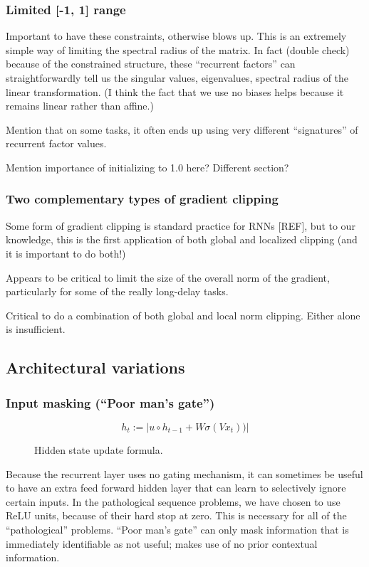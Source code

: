 \documentclass{article}
\begin{document}
\subsubsection{Limited [-1, 1] range}
Important to have these constraints, otherwise blows up.
This is an extremely simple way of limiting the spectral radius of the matrix.
In fact (double check) because of the constrained structure, these “recurrent factors” can straightforwardly tell us the singular values, eigenvalues, spectral radius of the linear transformation. (I think the fact that we use no biases helps because it remains linear rather than affine.)

Mention that on some tasks, it often ends up using very different “signatures” of recurrent factor values.

Mention importance of initializing to 1.0 here? Different section?
\subsubsection{Two complementary types of gradient clipping}

Some form of gradient clipping is standard practice for RNNs [REF], but to our knowledge, this is the first application of both global and localized clipping (and it is important to do both!)

Appears to be critical to limit the size of the overall norm of the gradient, particularly for some of the really long-delay tasks.

Critical to do a combination of both global and local norm clipping. Either alone is insufficient.
\subsection{Architectural variations}
\subsubsection{Input masking (“Poor man’s gate”)}

\begin{figure}
  \centering
  \[h_t := | u \circ h_{t-1} + W\sigma (Vx_t)) |\]
  \caption{Hidden state update formula.}
\end{figure}


Because the recurrent layer uses no gating mechanism, it can sometimes be useful to have an extra feed forward hidden layer that can learn to selectively ignore certain inputs. In the pathological sequence problems, we have chosen to use ReLU units, because of their hard stop at zero.
This is necessary for all of the “pathological” problems.
“Poor man’s gate” can only mask information that is immediately identifiable as not useful; makes use of no prior contextual information.
\end{document}
